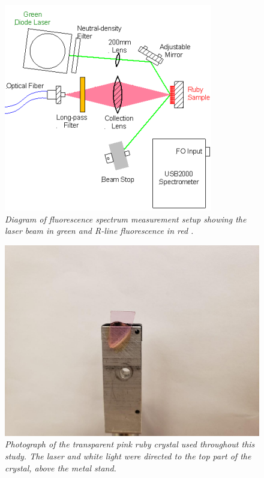 \documentclass[11pt, a4paper, twocolumn]{article}
\begin{document}
\begin{figure} [t]
\includegraphics[width=\linewidth]{laserBenchDiagram.png}
\caption{\textit{Diagram of fluorescence spectrum measurement setup showing the laser beam in green and R-line fluorescence in red \cite{Heiman}.}}
\label{fig:laserBenchDiagram}
\end{figure}

\begin{figure} [H]
\includegraphics[width=\linewidth]{rubyPhoto.png}
\caption{\textit{Photograph of the transparent pink ruby crystal used throughout this study. The laser and white light were directed to the top part of the crystal, above the metal stand.}}
\label{fig:rubyPhoto}
\end{figure}
\end{document}
